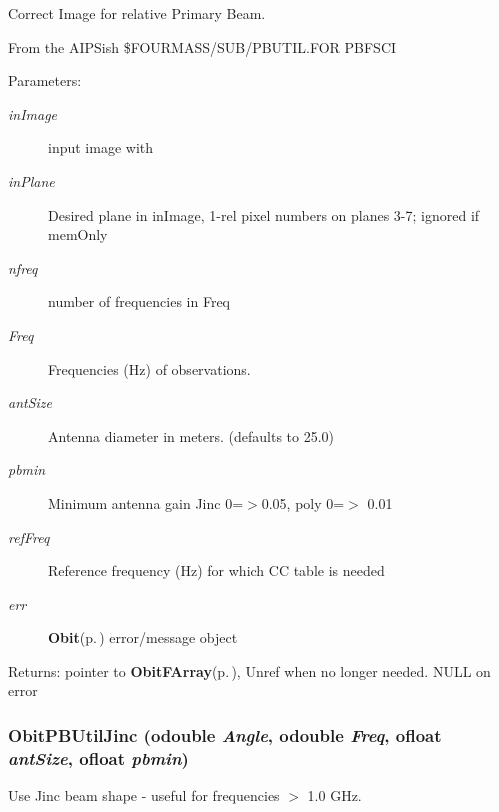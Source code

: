 Correct Image for relative Primary Beam. 

From the AIPSish \$FOURMASS/SUB/PBUTIL.FOR PBFSCI \begin{Desc}
\item[Parameters:]
\begin{description}
\item[{\em in\-Image}]input image with \item[{\em in\-Plane}]Desired plane in in\-Image, 1-rel pixel numbers on planes 3-7; ignored if mem\-Only \item[{\em nfreq}]number of frequencies in Freq \item[{\em Freq}]Frequencies (Hz) of observations. \item[{\em ant\-Size}]Antenna diameter in meters. (defaults to 25.0) \item[{\em pbmin}]Minimum antenna gain Jinc 0=$>$0.05, poly 0=$>$ 0.01 \item[{\em ref\-Freq}]Reference frequency (Hz) for which CC table is needed \item[{\em err}]{\bf Obit}{\rm (p.\,\pageref{structObit})} error/message object \end{description}
\end{Desc}
\begin{Desc}
\item[Returns:]pointer to {\bf Obit\-FArray}{\rm (p.\,\pageref{structObitFArray})}, Unref when no longer needed. NULL on error \end{Desc}
\subsubsection{ Obit\-PBUtil\-Jinc ({\bf odouble} {\em Angle}, {\bf odouble} {\em Freq}, {\bf ofloat} {\em ant\-Size}, {\bf ofloat} {\em pbmin})}\label{ObitPBUtil_8c_a1}


Use Jinc beam shape - useful for frequencies $>$ 1.0 GHz. 

